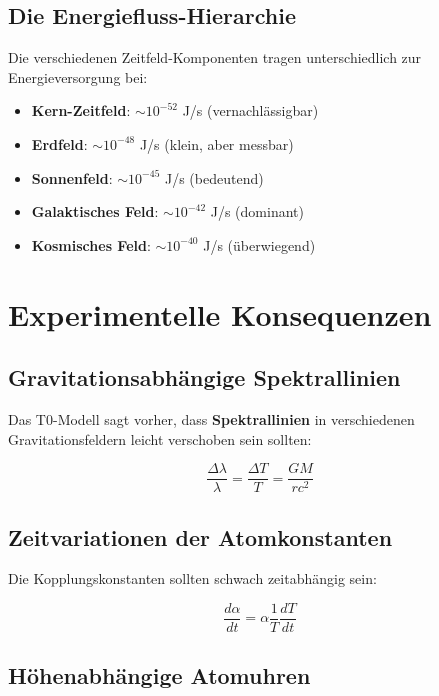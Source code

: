 \documentclass[12pt,a4paper]{report}
\begin{document}
	\subsection{Die Energiefluss-Hierarchie}
	
	Die verschiedenen Zeitfeld-Komponenten tragen unterschiedlich zur Energieversorgung bei:
	
	\begin{itemize}
		\item \textbf{Kern-Zeitfeld}: $\sim 10^{-52}$ J/s (vernachlässigbar)
		\item \textbf{Erdfeld}: $\sim 10^{-48}$ J/s (klein, aber messbar)
		\item \textbf{Sonnenfeld}: $\sim 10^{-45}$ J/s (bedeutend)
		\item \textbf{Galaktisches Feld}: $\sim 10^{-42}$ J/s (dominant)
		\item \textbf{Kosmisches Feld}: $\sim 10^{-40}$ J/s (überwiegend)
	\end{itemize}
	
	\section{Experimentelle Konsequenzen}
	
	\subsection{Gravitationsabhängige Spektrallinien}
	
	Das T0-Modell sagt vorher, dass \textbf{Spektrallinien} in verschiedenen Gravitationsfeldern leicht verschoben sein sollten:
	
	\begin{equation}
		\frac{\Delta\lambda}{\lambda} = \frac{\Delta T}{T} = \frac{GM}{rc^2}
	\end{equation}
	
	\subsection{Zeitvariationen der Atomkonstanten}
	
	Die Kopplungskonstanten sollten schwach zeitabhängig sein:
	
	\begin{equation}
		\frac{d\alpha}{dt} = \alpha \frac{1}{T}\frac{dT}{dt}
	\end{equation}
	
	\subsection{Höhenabhängige Atomuhren}
	
\end{document}
